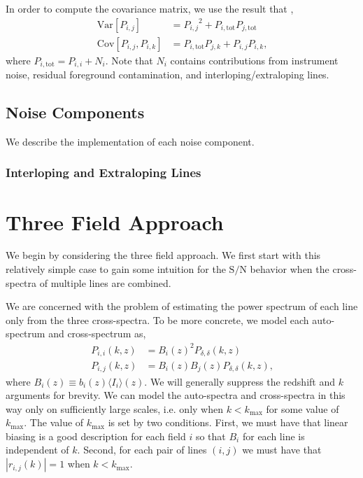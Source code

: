 \documentclass{aastex62}
\newcommand{\abs}[1]{\left| #1 \right|}
\newcommand{\beq}{\begin{equation}}
\newcommand{\eeq}{\end{equation}}
\newcommand{\ps}[1]{\ensuremath{P_{#1,#1}}}
\newcommand{\xps}[2]{\ensuremath{P_{#1,#2}}}
\newcommand{\kmax}{\ensuremath{k_{\text{max}}}}
\newcommand{\denps}{\ensuremath{P_{\delta,\delta}}}
\newcommand{\pstot}[1]{\ensuremath{P_{#1,\text{tot}}}}
\newcommand{\Var}[1]{\mathrm{Var}[#1]}
\newcommand{\Cov}[2]{\mathrm{Cov}[#1,#2]}
\newcommand{\avg}[1]{\ensuremath{\langle #1 \rangle}}
\newcommand{\SN}{\ensuremath{\text{S}/\text{N}}}
\begin{document}
In
order to compute the covariance matrix, we use the result that \citep[e.g.][]{2010JCAP...11..016V},
\beq\label{eq:var_cov}
\begin{split}
\Var{\xps{i}{j}} &= \xps{i}{j}^2 + \pstot{i}\pstot{j} \\
\Cov{\xps{i}{j}}{\xps{i}{k}} &= \pstot{i}\xps{j}{k} +
\xps{i}{j}\xps{i}{k}\text{,}
\end{split}
\eeq
where $\pstot{i} = \ps{i} + N_i$. Note that $N_i$ contains contributions from
instrument noise, residual foreground contamination, and
interloping/extraloping lines.

\subsection{Noise Components}\label{ssec:noise}
We describe the implementation of each noise component.

\subsubsection{Interloping and Extraloping Lines}\label{sssec:interlopers}


\section{Three Field Approach}\label{sec:tf}
We begin by considering the three field approach. We first start with this
relatively simple case to gain some intuition for the \SN{} behavior when the
cross-spectra of multiple lines are combined.

We are concerned with the problem of estimating the power spectrum of each
line only from the three cross-spectra. To be more concrete, we model each
auto-spectrum and cross-spectrum as,
\beq\label{eq:auto_xps}
\begin{split}
\ps{i}(k,z) &= B_i(z)^2 \denps(k,z) \\
\xps{i}{j}(k,z) &= B_i(z) B_j(z) \denps(k,z)\text{,}
\end{split}
\eeq
where $B_i(z) \equiv b_i(z) \avg{I_i}(z)$. We will generally suppress the
redshift and $k$ arguments for brevity. We can model the auto-spectra and
cross-spectra in this way only on sufficiently large scales, i.e. only when
$k<\kmax$ for some value of \kmax{}. The value of \kmax{} is set by two
conditions. First, we must have that linear biasing is a good description for
each field $i$ so that $B_i$ for each line is independent of $k$. Second, for
each pair of lines $(i,j)$ we must have that $\abs{r_{i,j}(k)} = 1$ when
$k<\kmax$.
\end{document}
